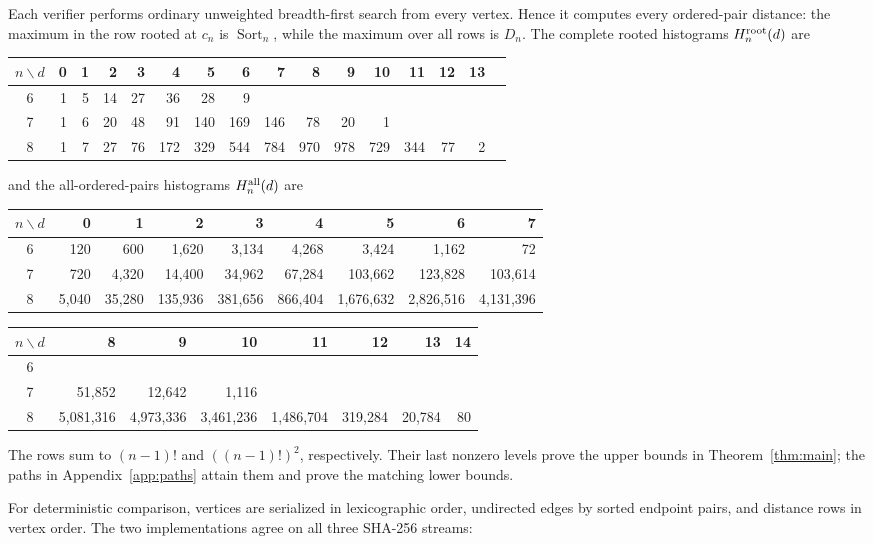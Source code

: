 \documentclass[11pt]{article}
\newcommand{\Sort}{\operatorname{Sort}}
\begin{document}
Each verifier performs ordinary unweighted breadth-first search from every
vertex.  Hence it computes every ordered-pair distance: the maximum in the row
rooted at $c_n$ is $\Sort_n$, while the maximum over all rows is $D_n$.  The
complete rooted histograms $H_n^{\rm root}(d)$ are

\begin{center}\small
\begin{tabular}{c|rrrrrrrrrrrrrrr}
\toprule
$n\backslash d$&0&1&2&3&4&5&6&7&8&9&10&11&12&13\\
\midrule
6&1&5&14&27&36&28&9&&&&&&&\\
7&1&6&20&48&91&140&169&146&78&20&1&&&\\
8&1&7&27&76&172&329&544&784&970&978&729&344&77&2\\
\bottomrule
\end{tabular}
\end{center}
and the all-ordered-pairs histograms $H_n^{\rm all}(d)$ are

\begin{center}\scriptsize
\begin{tabular}{c|rrrrrrrr}
\toprule
$n\backslash d$&0&1&2&3&4&5&6&7\\
\midrule
6&120&600&1,620&3,134&4,268&3,424&1,162&72\\
7&720&4,320&14,400&34,962&67,284&103,662&123,828&103,614\\
8&5,040&35,280&135,936&381,656&866,404&1,676,632&2,826,516&4,131,396\\
\bottomrule
\end{tabular}

\medskip
\begin{tabular}{c|rrrrrrr}
\toprule
$n\backslash d$&8&9&10&11&12&13&14\\
\midrule
6&&&&&&&\\
7&51,852&12,642&1,116&&&&\\
8&5,081,316&4,973,336&3,461,236&1,486,704&319,284&20,784&80\\
\bottomrule
\end{tabular}
\end{center}
The rows sum to $(n-1)!$ and $((n-1)!)^2$, respectively.  Their last nonzero
levels prove the upper bounds in Theorem~\ref{thm:main}; the paths in
Appendix~\ref{app:paths} attain them and prove the matching lower bounds.

For deterministic comparison, vertices are serialized in lexicographic order,
undirected edges by sorted endpoint pairs, and distance rows in vertex order.
The two implementations agree on all three SHA-256 streams:
\end{document}
